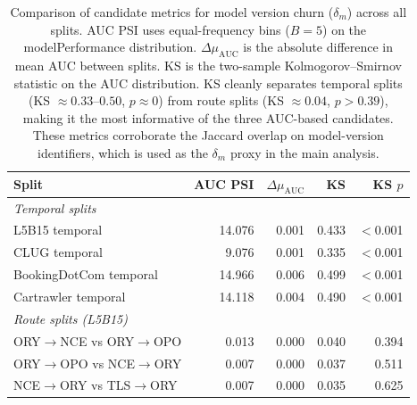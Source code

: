 \begin{table}[ht]
\caption{Comparison of candidate metrics for model version churn ($\delta_m$) across all splits. AUC PSI uses equal-frequency bins ($B = 5$) on the modelPerformance distribution. $\Delta\mu_{\text{AUC}}$ is the absolute difference in mean AUC between splits. KS is the two-sample Kolmogorov--Smirnov statistic on the AUC distribution. KS cleanly separates temporal splits (KS $\approx 0.33$--$0.50$, $p \approx 0$) from route splits (KS $\approx 0.04$, $p > 0.39$), making it the most informative of the three AUC-based candidates. These metrics corroborate the Jaccard overlap on model-version identifiers, which is used as the $\delta_m$ proxy in the main analysis.}
\label{tab:metric_selection}
\centering
\begin{tabular}{lrrrr}
\toprule
Split & AUC PSI & $\Delta\mu_{\text{AUC}}$ & KS & KS $p$ \\
\midrule
\multicolumn{5}{l}{\textit{Temporal splits}} \\
L5B15 temporal & 14.076 & 0.001 & 0.433 & $<$0.001 \\
CLUG temporal & 9.076 & 0.001 & 0.335 & $<$0.001 \\
BookingDotCom temporal & 14.966 & 0.006 & 0.499 & $<$0.001 \\
Cartrawler temporal & 14.118 & 0.004 & 0.490 & $<$0.001 \\
\midrule
\multicolumn{5}{l}{\textit{Route splits (L5B15)}} \\
ORY$\to$NCE vs ORY$\to$OPO & 0.013 & 0.000 & 0.040 & 0.394 \\
ORY$\to$OPO vs NCE$\to$ORY & 0.007 & 0.000 & 0.037 & 0.511 \\
NCE$\to$ORY vs TLS$\to$ORY & 0.007 & 0.000 & 0.035 & 0.625 \\
\bottomrule
\end{tabular}
\end{table}
